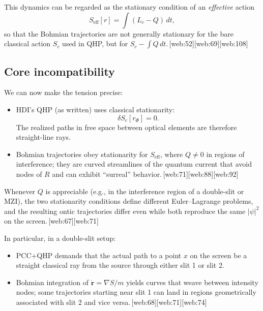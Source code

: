 \documentclass[11pt]{article}
\begin{document}
This dynamics can be regarded as the stationary condition of an \emph{effective} action
\begin{equation}
S_{\text{eff}}[r] = \int (L_c - Q)\,dt,
\end{equation}
so that the Bohmian trajectories are not generally stationary for the bare classical action \(S_c\) used in QHP, but for \(S_c - \int Q\,dt\).\,[web:52][web:69][web:108]

\subsection{Core incompatibility}

We can now make the tension precise:

\begin{itemize}[leftmargin=*]
  \item HDI's QHP (as written) uses classical stationarity:
  \[
  \delta S_c[r_\Phi] = 0.
  \]
  The realized paths in free space between optical elements are therefore straight-line rays.

  \item Bohmian trajectories obey stationarity for \(S_{\text{eff}}\), where \(Q\neq 0\) in regions of interference; they are curved streamlines of the quantum current that avoid nodes of \(R\) and can exhibit ``surreal'' behavior.\,[web:71][web:88][web:92]
\end{itemize}

Whenever \(Q\) is appreciable (e.g., in the interference region of a double-slit or MZI), the two stationarity conditions define different Euler--Lagrange problems, and the resulting ontic trajectories differ even while both reproduce the same \(|\psi|^2\) on the screen.\,[web:67][web:71]

In particular, in a double-slit setup:

\begin{itemize}[leftmargin=*]
  \item PCC+QHP demands that the actual path to a point \(x\) on the screen be a straight classical ray from the source through either slit 1 or slit 2.

  \item Bohmian integration of \(\dot{\mathbf r} = \nabla S/m\) yields curves that weave between intensity nodes; some trajectories starting near slit 1 can land in regions geometrically associated with slit 2 and vice versa.\,[web:68][web:71][web:74]
\end{itemize}
\end{document}

